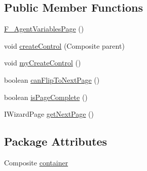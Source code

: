 \subsection*{Public Member Functions}
\begin{DoxyCompactItemize}
\item 
\hyperlink{classit_1_1isislab_1_1masonhelperdocumentation_1_1mason_1_1wizards_1_1_f___agent_variables_page_a8e1919629c6094f8be3a785d299ae660}{F\-\_\-\-Agent\-Variables\-Page} ()
\item 
void \hyperlink{classit_1_1isislab_1_1masonhelperdocumentation_1_1mason_1_1wizards_1_1_f___agent_variables_page_af74f390c1f0db3c70d4d2d0abe3be3ff}{create\-Control} (Composite parent)
\item 
void \hyperlink{classit_1_1isislab_1_1masonhelperdocumentation_1_1mason_1_1wizards_1_1_f___agent_variables_page_a182a280459538ed143e8cd15904dd7c3}{my\-Create\-Control} ()
\item 
boolean \hyperlink{classit_1_1isislab_1_1masonhelperdocumentation_1_1mason_1_1wizards_1_1_f___agent_variables_page_af65edb71977cd4e013b74eed7bff40a8}{can\-Flip\-To\-Next\-Page} ()
\item 
boolean \hyperlink{classit_1_1isislab_1_1masonhelperdocumentation_1_1mason_1_1wizards_1_1_f___agent_variables_page_ac7388bb1dbdb4e3bbd77d1623602d4d8}{is\-Page\-Complete} ()
\item 
I\-Wizard\-Page \hyperlink{classit_1_1isislab_1_1masonhelperdocumentation_1_1mason_1_1wizards_1_1_f___agent_variables_page_adb2fda5d8a33bb1cb27eda1854c5a89b}{get\-Next\-Page} ()
\end{DoxyCompactItemize}
\subsection*{Package Attributes}
\begin{DoxyCompactItemize}
\item 
Composite \hyperlink{classit_1_1isislab_1_1masonhelperdocumentation_1_1mason_1_1wizards_1_1_f___agent_variables_page_aa9f4b2d9a3bfc361d12d8832f8f7e212}{container}
\end{DoxyCompactItemize}
